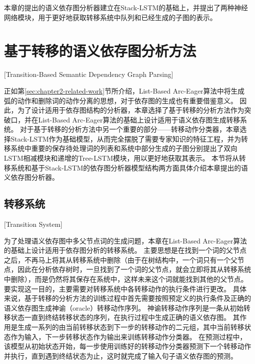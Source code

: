 本章的提出的语义依存图分析器建立在Stack-LSTM的基础上，并提出了两种神经网络模块，用于更好地获取转移系统中队列和已经生成的子图的表示。


\section{基于转移的语义依存图分析方法}[Transition-Based Semantic Dependency Graph Parsing]
\label{sec:chapter2-parsing-method}

正如第\ref{sec:chapter2-related-work}节所介绍，List-Based Arc-Eager算法中将生成弧的动作和删除词的动作分离的思想，对于依存图的生成也有重要借鉴意义。
因此，为了设计适用于依存图结构的分析器，本章选择了基于转移的分析方法作为突破口，并在List-Based Arc-Eager算法的基础上设计适用于语义依存图生成转移系统。
对于基于转移的分析方法中另一个重要的部分——转移动作分类器，本章选择Stack-LSTM作为基础模型，从而完全摆脱了需要专家知识的特征工程，并为转移系统中重要的保存待处理词的列表和系统中部分生成的子图分别提出了双向LSTM相减模块和递增的Tree-LSTM模块，用以更好地获取其表示。
本节将从转移系统和基于Stack-LSTM的依存图分析器模型结构两方面具体介绍本章提出的语义依存图分析器。

\subsection{转移系统}[Transition System]

为了处理语义依存图中多父节点词的生成问题，本章在List-Based Arc-Eager算法的基础上设计适用于依存图分析的转移系统。
主要思想是在找到一个词的父节点之后，不再马上将其从转移系统中删除（由于在树结构中，一个词只有一个父节点，因此在分析依存树时，一旦找到了一个词的父节点，就会立即将其从转移系统中删除），而是仍然将其保存在系统中，这样未来这个词就能找到其他的父节点。
要实现这一目的，主要需要对转移系统中各转移动作的执行条件进行更改。
具体来说，基于转移的分析方法的训练过程中首先需要按照预定义的执行条件及正确的语义依存图生成神谕（oracle）转移动作序列。
神谕转移动作序列是一条从初始转移状态一直到终结转移状态的序列，在执行过程中生成正确的语义依存图。
其作用是生成一系列的由当前转移状态到下一步的转移动作的二元组，其中当前转移状态作为输入，下一步转移状态作为输出来训练转移动作分类器。
在预测过程中，该模型从初始状态开始，每一步使用训练好的转移动作分类器预测下一个转移动作并执行，直到遇到终结状态为止，这时就完成了输入句子语义依存图的预测。

